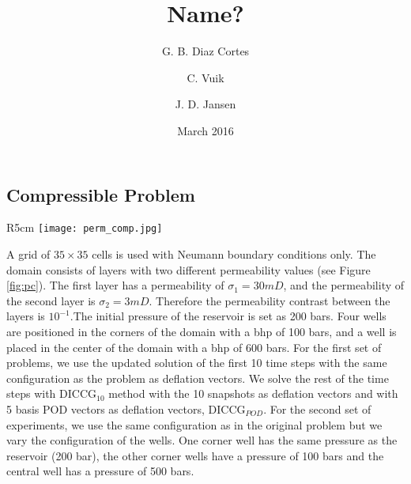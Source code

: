 \documentclass[12pt]{article}
\title{Name?}
\author[1]{G. B. Diaz Cortes}
\author[1]{C. Vuik}
\author[2]{J. D. Jansen}
\affil[1]{Department of Applied Mathematics, TU Delft}
\affil[2]{Department of Geoscience \& Engineering, TU Delft}
\date{March 2016}
\begin{document}

\newpage
\subsection*{Compressible Problem}

\begin{wrapfigure}{R}{5cm}
\centering 
\vspace{-10pt}
\texttt{[image: perm\_comp.jpg]}
 \vspace{-5pt}
\caption{ Heterogeneous permeability, 5 wells, compressible problem.}\label{fig:pc}
\vspace{-15pt}
\end{wrapfigure} 

A grid of $35\times 35$ cells is used with Neumann boundary conditions only. The domain consists of layers with two different permeability values (see Figure \ref{fig:pc}). The first layer has a permeability of $\sigma_1 = 30mD$, and the permeability of the second layer is $\sigma_2 = 3mD$. Therefore the permeability contrast between the layers is $10^{-1}$.The initial pressure of the reservoir is set as 200 bars. Four wells are positioned in the corners of the domain with a bhp of 100 bars, and a well is placed in the center of the domain with a bhp of 600 bars.
 For the first set of problems, we use the updated solution of the first 10 time steps with the same configuration as the problem as deflation vectors. We solve the rest of the time steps with DICCG$_{10}$ method with the 10 snapshots as deflation vectors and with 5 basis POD vectors as deflation vectors, DICCG$_{POD}$.
 For the second set of experiments, we use the same configuration as in the original problem but we vary the configuration of the wells. One corner well has the same pressure as the reservoir (200 bar), the other corner wells have a pressure of 100 bars and the central well has a pressure of 500 bars. 
\end{document}
